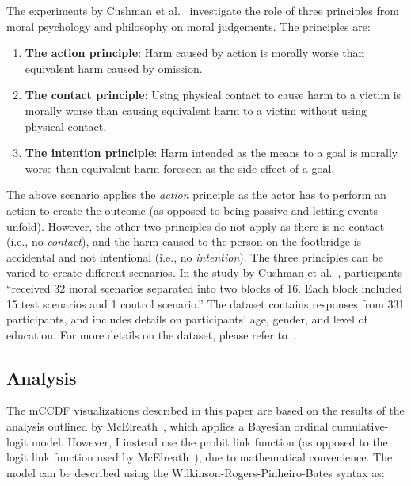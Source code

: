\documentclass{vgtc}                          %
\newcommand{\ccdf}[1]{mCCDF#1}
\begin{document}
The experiments by Cushman et al.~\cite{cushman_role_2006} investigate the role of three principles from moral psychology and philosophy on moral judgements. The principles are:

\vspace{-4pt}
\begin{enumerate}
    \itemsep0pt
    \item \textbf{The action principle}: Harm caused by action is morally worse than equivalent harm caused by omission.
    \item \textbf{The contact principle}: Using physical contact to cause harm to a victim is morally worse than causing equivalent harm to a victim without using physical contact.
    \item \textbf{The intention principle}: Harm intended as the means to a goal is morally worse than equivalent harm foreseen as the side effect of a goal.
\end{enumerate}
\vspace{-4pt}

The above scenario applies the \textit{action} principle as the actor has to perform an action to create the outcome (as opposed to being passive and letting events unfold). However, the other two principles do not apply as there is no contact (i.e., no \textit{contact}), and the harm caused to the person on the footbridge is accidental and not intentional (i.e., no \textit{intention}). The three principles can be varied to create different scenarios. In the study by Cushman et al.~\cite{cushman_role_2006}, participants ``received 32 moral scenarios separated into two blocks of 16. Each block included 15 test scenarios and 1 control scenario.'' The dataset contains responses from 331 participants, and includes details on participants' age, gender, and level of education. For more details on the dataset, please refer to~\cite{mcelreath_statistical_2020, cushman_role_2006}.

\subsection{Analysis}
The \ccdf{} visualizations described in this paper are based on the results of the analysis outlined by McElreath~\cite{mcelreath_statistical_2020}, which applies a Bayesian ordinal cumulative-logit model. However, I instead use the probit link function (as opposed to the logit link function used by McElreath~\cite{mcelreath_statistical_2020}), due to mathematical convenience. The model can be described using the Wilkinson-Rogers-Pinheiro-Bates syntax \cite{bates_fitting_2015, pinheiro2017package, wilkinson1973symbolic} as:
\end{document}
